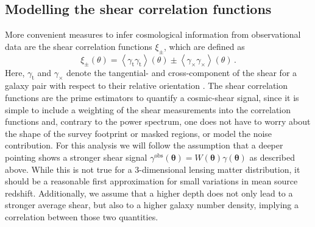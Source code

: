 \documentclass{aa}
\renewcommand{\rm}{\mathrm}
\def\b#1{\bm{#1}}
\def\la{\left<}
\def\ra{\right>}
\begin{document}
\subsection{Modelling the shear correlation functions}
\label{sec:xipm_analytic}
More convenient measures to infer cosmological information from observational data are the shear correlation functions $\xi_\pm$, which are defined as \begin{equation}
\xi_\pm(\theta) = \la \gamma_{\rm t}\gamma_{\rm t}\ra(\theta) \pm \la \gamma_\times\gamma_\times\ra(\theta) \, .
\end{equation}
Here, $\gamma_{\rm{t}}$ and $\gamma_\times$ denote the tangential- and cross-component of the shear for a galaxy pair with respect to their relative orientation \citep[see][]{2002A&A...396....1S}.
The shear correlation functions are the prime estimators to quantify a cosmic-shear signal, since it is simple to include a weighting of the shear measurements into the correlation functions and, contrary to the power spectrum, one does not have to worry about the shape of the survey footprint or masked regions, or model the noise contribution. 
For this analysis we will follow the assumption that a deeper pointing shows a stronger shear signal $\gamma^{\rm{obs}}(\b\theta) = W(\b\theta)\gamma(\b\theta)$ as described above. While this is not true for a 3-dimensional lensing matter distribution, it should be a reasonable first approximation for small variations in mean source redshift. Additionally, we assume that a higher depth does not only lead to a stronger average shear, but also to a higher galaxy number density, implying a correlation between those two quantities.
\end{document}
